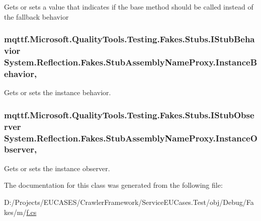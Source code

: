 Gets or sets a value that indicates if the base method should be called instead of the fallback behavior

\hypertarget{class_system_1_1_reflection_1_1_fakes_1_1_stub_assembly_name_proxy_aa2cbe5bd7ecc9a5a54c007411a770aef}{
\subsubsection[{Instance\-Behavior}]{\setlength{\rightskip}{0pt plus 5cm}mqttf.\-Microsoft.\-Quality\-Tools.\-Testing.\-Fakes.\-Stubs.\-I\-Stub\-Behavior System.\-Reflection.\-Fakes.\-Stub\-Assembly\-Name\-Proxy.\-Instance\-Behavior\hspace{0.3cm}{\ttfamily [get]}, {\ttfamily [set]}}}\label{class_system_1_1_reflection_1_1_fakes_1_1_stub_assembly_name_proxy_aa2cbe5bd7ecc9a5a54c007411a770aef}


Gets or sets the instance behavior.

\hypertarget{class_system_1_1_reflection_1_1_fakes_1_1_stub_assembly_name_proxy_a6d9bf564b08e51c79ea7afebfe2c260d}{
\subsubsection[{Instance\-Observer}]{\setlength{\rightskip}{0pt plus 5cm}mqttf.\-Microsoft.\-Quality\-Tools.\-Testing.\-Fakes.\-Stubs.\-I\-Stub\-Observer System.\-Reflection.\-Fakes.\-Stub\-Assembly\-Name\-Proxy.\-Instance\-Observer\hspace{0.3cm}{\ttfamily [get]}, {\ttfamily [set]}}}\label{class_system_1_1_reflection_1_1_fakes_1_1_stub_assembly_name_proxy_a6d9bf564b08e51c79ea7afebfe2c260d}


Gets or sets the instance observer.



The documentation for this class was generated from the following file\-:\begin{DoxyCompactItemize}
\item 
D\-:/\-Projects/\-E\-U\-C\-A\-S\-E\-S/\-Crawler\-Framework/\-Service\-E\-U\-Cases.\-Test/obj/\-Debug/\-Fakes/m/\hyperlink{m_2f_8cs}{f.\-cs}\end{DoxyCompactItemize}

